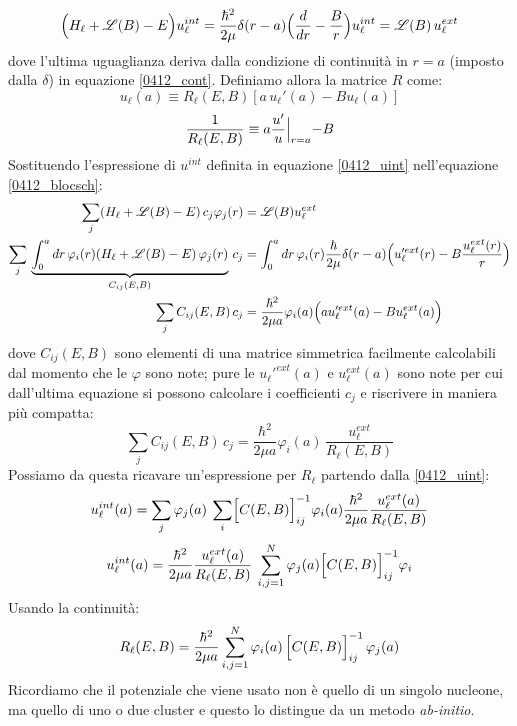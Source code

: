 \begin{equation}\label{0412_blocsch}
\Bigl ( H_\ell + \mathscr{L}(B)-E \Bigr ) u_\ell^{int} = \frac{\hbar^2}{2\mu} \delta(r-a) \Bigl ( \frac{d}{dr} - \frac{B}{r} \Bigr ) u_\ell^{int} = \mathscr{L}(B)\, u_\ell^{ext} 
\end{equation}
dove l'ultima uguaglianza deriva dalla condizione di continuità in $r=a$ (imposto dalla $\delta$) in equazione \eqref{0412_cont}. Definiamo allora la matrice $R$  come:
\begin{equation}\label{0412_Rl}
u_\ell (a) \equiv R_\ell (E,B) [a \, u_\ell ' (a) - B u_\ell (a)]	
\end{equation}
$$\frac{1}{R_\ell (E,B)} \equiv a \frac{u'}{u}\Bigl |_{r=a} - B$$
Sostituendo l'espressione di $u^{int}$ definita in equazione \eqref{0412_uint} nell'equazione \eqref{0412_blocsch}:
\begin{displaymath}
	\begin{aligned}
	\sum_j (H_\ell + \mathscr{L}(B)-E) \, c_j \varphi_j(r) &= \mathscr{L}(B) u_\ell^{ext} \\
	\sum_{j} \, \underbrace{\int_0^a dr\, \varphi_i (r) (H_\ell + \mathscr{L}(B)-E) \, \varphi_j(r) }_{C_{ij}(E,B)}\, c_j &= \int_0^a dr \, \varphi_i(r) \frac{\hbar}{2\mu} \delta(r-a) \Bigl ( u_\ell'^{ext}(r) - B\frac{u^{ext}_\ell (r)}{r} \Bigr ) \\ 
	\sum_j C_{ij}(E,B)\, c_j &= \frac{\hbar^2}{2\mu a} \varphi_i(a) \Bigl ( a u_\ell '^{ext} (a) - B u_\ell^{ext} (a) \Bigr ) 
	\end{aligned}
\end{displaymath}
dove $C_{ij}(E,B)$ sono elementi di una matrice simmetrica facilmente calcolabili dal momento che le $\varphi$ sono note; pure le $u_\ell '^{ext} (a)$ e $u_\ell^{ext} (a)$ sono note per cui dall'ultima equazione si possono calcolare i coefficienti $c_j$ e riscrivere in maniera più compatta:
\begin{equation}\label{0412_eq9}
\sum_j C_{ij}(E,B) \, c_j = \frac{\hbar^2}{2\mu a} \varphi_i(a)	\, \frac{u_\ell^{ext}}{R_\ell(E,B)}
\end{equation}
Possiamo da questa ricavare un'espressione per $R_\ell$ partendo dalla \eqref{0412_uint}:
$$u_\ell^{int}(a) = \sum_j \varphi_j(a) \: \sum_i  \Bigl [ C(E,B) \Bigr ]_{ij}^{-1} \varphi_i(a) \frac{\hbar^2}{2\mu a} \frac{u_\ell^{ext}(a)}{R_\ell(E,B)}$$
\begin{equation}\label{0412_uint2}
	u_\ell^{int}(a) = \frac{\hbar^2}{2\mu a} \frac{u_\ell^{ext}(a)}{R_\ell(E,B)} \:  \sum_{i,j=1}^N \varphi_j(a) \Bigl [ C(E,B) \Bigr ]_{ij}^{-1} \varphi_i	
\end{equation}
Usando la continuità:
\begin{equation}\label{0412_Rl2}
R_\ell(E,B) = \frac{\hbar^2}{2\mu a} \sum_{i,j=1}^N \varphi_i(a)\, \Bigl [ C(E,B) \Bigr ]_{ij}^{-1}\, \varphi_j(a) 
\end{equation}
Ricordiamo che il potenziale che viene usato non è quello di un singolo nucleone, ma quello di uno o due cluster e questo lo distingue da un metodo \textit{ab-initio}.

